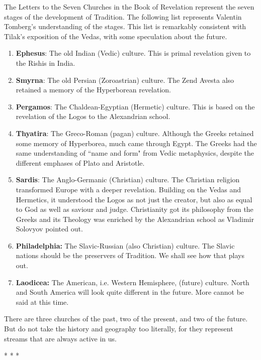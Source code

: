 The Letters to the Seven Churches in the Book of Revelation represent the seven stages of the development of Tradition. The following list represents Valentin Tomberg's understanding of the stages. This list is remarkably consistent with Tilak's exposition of the Vedas, with some speculation about the future.

\begin{enumerate}
\item \textbf{Ephesus}: The old Indian (Vedic) culture. This is primal revelation given to the Rishis in India. 
\item \textbf{Smyrna}: The old Persian (Zoroastrian) culture. The Zend Avesta also retained a memory of the Hyperborean revelation. 
\item \textbf{Pergamos}: The Chaldean-Egyptian (Hermetic) culture. This is based on the revelation of the Logos to the Alexandrian school. 
\item \textbf{Thyatira}: The Greco-Roman (pagan) culture. Although the Greeks retained some memory of Hyperborea, much came through Egypt. The Greeks had the same understanding of ``name and form" from Vedic metaphysics, despite the different emphases of Plato and Aristotle. 
\item \textbf{Sardis}: The Anglo-Germanic (Christian) culture. The Christian religion transformed Europe with a deeper revelation. Building on the Vedas and Hermetics, it understood the Logos as not just the creator, but also as equal to God as well as saviour and judge. Christianity got its philosophy from the Greeks and its Theology was enriched by the Alexandrian school as Vladimir Solovyov pointed out. 
\item \textbf{Philadelphia:} The Slavic-Russian (also Christian) culture. The Slavic nations should be the preservers of Tradition. We shall see how that plays out. 
\item \textbf{Laodicea:} The American, i.e. Western Hemisphere, (future) culture. North and South America will look quite different in the future. More cannot be said at this time. 
\end{enumerate}
There are three churches of the past, two of the present, and two of the future. But do not take the history and geography too literally, for they represent streams that are always active in us.




\begin{center}* * *\end{center}

